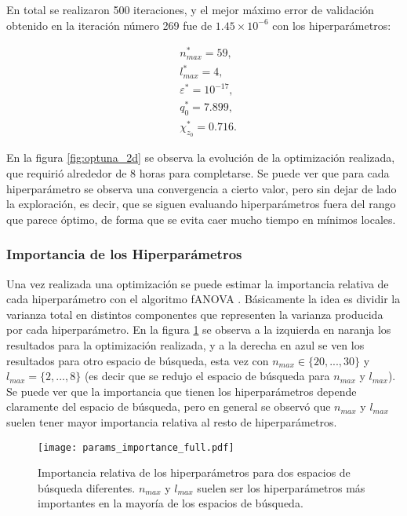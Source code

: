 En total se realizaron 500 iteraciones, y el mejor máximo error de validación obtenido en la iteración número 269 fue de $1{.}45\times 10^{-6}$ con los hiperparámetros:

\begin{align*}
&n_{max}^* = 59, \\
 &l_{max}^* = 4, \\
&\varepsilon^* = 10^{-17},\\
 &q_0^* = 7.899, \\
 &\chi_{z_0}^* = 0.716.
\end{align*}

En la figura \ref{fig:optuna_2d} se observa la evolución de la optimización realizada, que requirió alrededor de 8 horas para completarse. Se puede ver que para cada hiperparámetro se observa una convergencia a cierto valor, pero sin dejar de lado la exploración, es decir, que se siguen evaluando hiperparámetros fuera del rango que parece óptimo, de forma que se evita caer mucho tiempo en mínimos locales.


\subsubsection{Importancia de los Hiperparámetros}

Una vez realizada una optimización se puede estimar la importancia relativa de cada hiperparámetro con el algoritmo fANOVA \cite{pmlr-v32-hutter14}. Básicamente la idea es dividir la varianza total en distintos componentes que representen la varianza producida por cada hiperparámetro. En la figura \ref{fig:param_import} se observa a la izquierda en naranja los resultados para la optimización realizada, y a la derecha en azul se ven los resultados para otro espacio de búsqueda, esta vez con $n_{max} \in \{20, ..., 30\}$  y $l_{max} = \{2, ..., 8\}$ (es decir que se redujo el espacio de búsqueda para $n_{max}$ y $l_{max}$). Se puede ver que la importancia que tienen los hiperparámetros depende claramente del espacio de búsqueda, pero en general se observó que $n_{max}$ y $l_{max}$ suelen tener mayor importancia relativa al resto de hiperparámetros.

\begin{figure}[h!]
\centering
\texttt{[image: params\_importance\_full.pdf]}
\caption{Importancia relativa de los hiperparámetros para dos espacios de búsqueda diferentes. $n_{max}$ y $l_{max}$ suelen ser los hiperparámetros más importantes en la mayoría de los espacios de búsqueda.}
\label{fig:param_import}
\end{figure}




